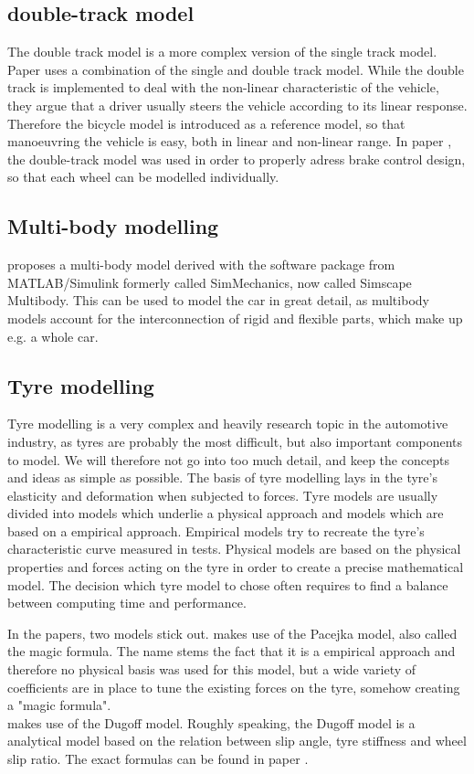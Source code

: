 \documentclass[conference]{IEEEtran}
\begin{document}
\subsection{double-track model}
The double track model is a more complex version of the single track model. 
Paper \cite{Song} uses a combination of the single and double track model. While the double track is implemented to deal with the non-linear characteristic of the vehicle, they argue that a driver usually steers the vehicle according to its linear response. Therefore the bicycle model is introduced as a reference model, so that manoeuvring the vehicle is easy, both in linear and non-linear range.
In paper \cite{Weidong}, the double-track model was used in order to properly adress
brake control design, so that each wheel can be modelled individually.

\subsection{Multi-body modelling}

\cite{vandersande} proposes a multi-body model derived with the software package from MATLAB/Simulink formerly called SimMechanics, now called Simscape Multibody. This can be used to model the car in great detail, as multibody models account for the interconnection of rigid and flexible parts, which make up e.g. a whole car.

\subsection{Tyre modelling}

Tyre modelling is a very complex and heavily research topic in the automotive industry, as tyres are probably the most difficult, but also important components to model. We will therefore not go into too much detail, and keep the concepts and ideas as simple as possible.
The basis of tyre modelling lays in the tyre's elasticity and deformation when subjected to forces. Tyre models are usually divided into models which underlie a physical approach and models which are based on a empirical approach. Empirical models try to recreate the tyre's characteristic curve measured in tests. Physical models are based on the physical properties and forces acting on the tyre in order to create a precise mathematical model. The decision which tyre model to chose often requires to find a balance between computing time and performance.

In the papers, two models stick out. \cite{Se-Wook} makes use of the Pacejka model, also called the magic formula. The name stems the fact that it is a empirical approach and therefore no physical basis was used for this model, but a wide variety of coefficients are in place to tune the existing forces on the tyre, somehow creating a "magic formula".\\
\cite{Weidong} makes use of the Dugoff model. Roughly speaking, the Dugoff model is a analytical model based on the relation between slip angle, tyre stiffness and wheel slip ratio. The exact formulas can be found in paper \cite{Weidong}.
\end{document}

